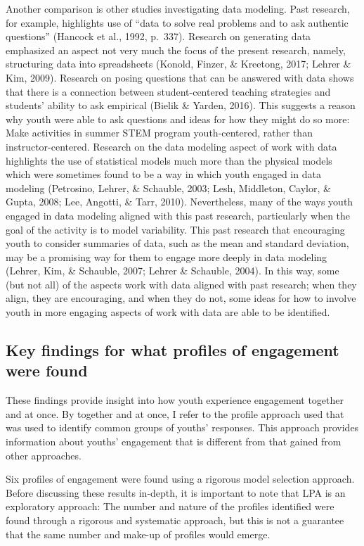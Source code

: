 \documentclass[]{msu-thesis}
\theoremstyle{definition}
\theoremstyle{definition}
\theoremstyle{definition}
\theoremstyle{remark}
\begin{document}
Another comparison is other studies investigating data modeling. Past
research, for example, highlights use of ``data to solve real problems
and to ask authentic questions'' (Hancock et al., 1992, p.~337).
Research on generating data emphasized an aspect not very much the focus
of the present research, namely, structuring data into spreadsheets
(Konold, Finzer, \& Kreetong, 2017; Lehrer \& Kim, 2009). Research on
posing questions that can be answered with data shows that there is a
connection between student-centered teaching strategies and students'
ability to ask empirical (Bielik \& Yarden, 2016). This suggests a
reason why youth were able to ask questions and ideas for how they might
do so more: Make activities in summer STEM program youth-centered,
rather than instructor-centered. Research on the data modeling aspect of
work with data highlights the use of statistical models much more than
the physical models which were sometimes found to be a way in which
youth engaged in data modeling (Petrosino, Lehrer, \& Schauble, 2003;
Lesh, Middleton, Caylor, \& Gupta, 2008; Lee, Angotti, \& Tarr, 2010).
Nevertheless, many of the ways youth engaged in data modeling aligned
with this past research, particularly when the goal of the activity is
to model variability. This past research that encouraging youth to
consider summaries of data, such as the mean and standard deviation, may
be a promising way for them to engage more deeply in data modeling
(Lehrer, Kim, \& Schauble, 2007; Lehrer \& Schauble, 2004). In this way,
some (but not all) of the aspects work with data aligned with past
research; when they align, they are encouraging, and when they do not,
some ideas for how to involve youth in more engaging aspects of work
with data are able to be identified.

\subsection{Key findings for what profiles of engagement were
found}\label{key-findings-for-what-profiles-of-engagement-were-found}

These findings provide insight into how youth experience engagement
together and at once. By together and at once, I refer to the profile
approach used that was used to identify common groups of youths'
responses. This approach provides information about youths' engagement
that is different from that gained from other approaches.

Six profiles of engagement were found using a rigorous model selection
approach. Before discussing these results in-depth, it is important to
note that LPA is an exploratory approach: The number and nature of the
profiles identified were found through a rigorous and systematic
approach, but this is not a guarantee that the same number and make-up
of profiles would emerge.
\end{document}
